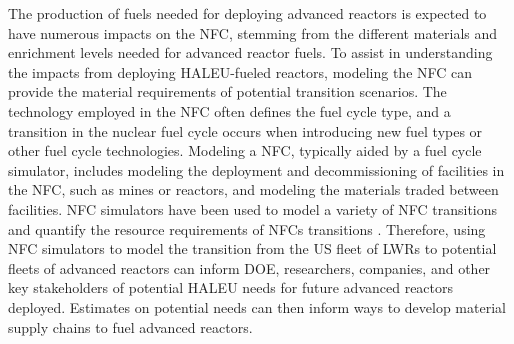 The production of fuels needed for deploying advanced reactors 
is expected to have numerous impacts on the \gls{NFC}, stemming from 
the different materials and enrichment levels needed for advanced reactor
fuels. To assist in understanding the impacts 
from deploying \gls{HALEU}-fueled reactors, modeling the \gls{NFC} 
can provide the material requirements of potential transition scenarios. 
The technology employed in the \gls{NFC} often defines the fuel 
cycle type, and a transition in the nuclear fuel cycle occurs when 
introducing new fuel types or other fuel cycle technologies.  
Modeling  a \gls{NFC}, typically aided by a fuel cycle simulator, 
includes modeling the deployment and decommissioning of facilities in 
the \gls{NFC}, such as mines or reactors, and modeling the materials 
traded between facilities. 
\gls{NFC} simulators have been used to model a variety of \gls{NFC} 
transitions \cite{sunny_transition_2015,bae_fuel_2018,piet_dynamic_2011} 
and quantify the resource requirements of \glspl{NFC} transitions
\cite{bachmann_enrichment_2021}. Therefore, using \gls{NFC} simulators to 
model the transition from the US fleet of \glspl{LWR} to potential 
fleets of advanced reactors can inform \gls{DOE}, researchers, companies, 
and other key stakeholders of potential \gls{HALEU} needs for future 
advanced reactors deployed. Estimates on potential needs can then inform 
ways to develop material supply chains to fuel advanced reactors. 

